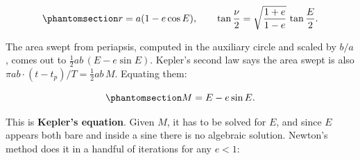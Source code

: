 \documentclass[
  10.5pt,
  letterpaper,
]{scrbook}
\theoremstyle{definition}
\theoremstyle{plain}
\theoremstyle{remark}
\begin{document}
\begin{equation}\protect\phantomsection\label{eq-eccentric-anomaly}{
r = a(1 - e\cos E), \qquad
\tan\frac{\nu}{2} = \sqrt{\frac{1+e}{1-e}}\,\tan\frac{E}{2}.
}\end{equation}

The area swept from periapsis, computed in the auxiliary circle and
scaled by \(b/a\), comes out to \(\tfrac12 ab\,(E - e\sin E)\). Kepler's
second law says the area swept is also
\(\pi ab \cdot (t-t_p)/T = \tfrac12 ab\,M\). Equating them:

\begin{equation}\protect\phantomsection\label{eq-kepler-equation}{
M = E - e\sin E.
}\end{equation}

This is \textbf{Kepler's equation}. Given \(M\), it has to be solved for
\(E\), and since \(E\) appears both bare and inside a sine there is no
algebraic solution. Newton's method does it in a handful of iterations
for any \(e < 1\):
\end{document}
